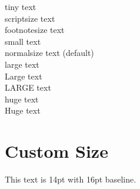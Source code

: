 \documentclass[12pt, a4paper]{article}
\begin{document}
{\tiny tiny text} \\
{\scriptsize scriptsize text} \\
{\footnotesize footnotesize text} \\
{\small small text} \\
{\normalsize normalsize text (default)} \\
{\large large text} \\
{\Large Large text} \\
{\LARGE LARGE text} \\
{\huge huge text} \\
{\Huge Huge text}

\section*{Custom Size}
\fontsize{14pt}{16pt}\selectfont
This text is 14pt with 16pt baseline.
\end{document}
